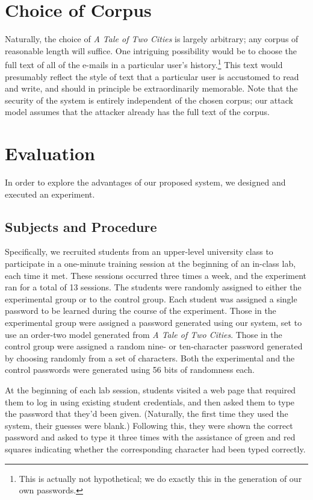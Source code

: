 \documentclass[preprint]{soups}
\newcommand{\sectionNewpage}{}
\let\SOriginalthesubsection\thesubsection
\let\SOriginalthesubsubsection\thesubsubsection
\newcommand{\Ssection}[2]{\section[#1]{#2}\let\thesubsection\SOriginalthesubsection}
\newcommand{\Ssubsection}[2]{\subsection[#1]{#2}\let\thesubsubsection\SOriginalthesubsubsection}
\newcommand{\NoteBox}[1]{\footnote{#1}}
\newcommand{\NoteContent}[1]{#1}
\begin{document}
\sectionNewpage

\Ssection{Choice of Corpus}{Choice of Corpus}\label{t:x28part_x22Choicex5fofx5fCorpusx22x29}

Naturally, the choice of \textit{A Tale of Two Cities} is
largely arbitrary; any corpus of reasonable length will
suffice. One intriguing possibility would be to choose the
full text of all of the e{-}mails in a particular user{'}s
history.\NoteBox{\NoteContent{ This is actually not hypothetical; we do
exactly this in the generation of our own passwords.}} This
text would presumably reflect the style of text that a
particular user is accustomed to read and write, and should
in principle be extraordinarily memorable.  Note that the
security of the system is entirely independent of the chosen
corpus; our attack model assumes that the attacker already
has the full text of the corpus.

\sectionNewpage

\Ssection{Evaluation}{Evaluation}\label{t:x28part_x22Evaluationx22x29}

In order to explore the advantages of our proposed system,
we designed and executed an experiment.

\Ssubsection{Subjects and Procedure}{Subjects and Procedure}\label{t:x28part_x22Subjectsx5fandx5fProcedurex22x29}

Specifically, we recruited students from an upper{-}level
university class to participate in a one{-}minute training
session at the beginning of an in{-}class lab, each time it
met. These sessions occurred three times a week, and the
experiment ran for a total of 13 sessions. The students were
randomly assigned to either the experimental group or to the
control group.  Each student was assigned a single password
to be learned during the course of the experiment. Those in
the experimental group were assigned a password generated
using our system, set to use an order{-}two model generated
from \textit{A Tale of Two Cities}. Those in the control group
were assigned a random nine{-} or ten{-}character password
generated by choosing randomly from a set of characters.
Both the experimental and the control passwords were
generated using 56 bits of randomness each.

At the beginning of each lab session, students visited a web
page that required them to log in using existing student
credentials, and then asked them to type the password that
they{'}d been given. (Naturally, the first time they used the
system, their guesses were blank.) Following this, they were
shown the correct password and asked to type it three times
with the assistance of green and red squares indicating
whether the corresponding character had been typed
correctly.
\end{document}
